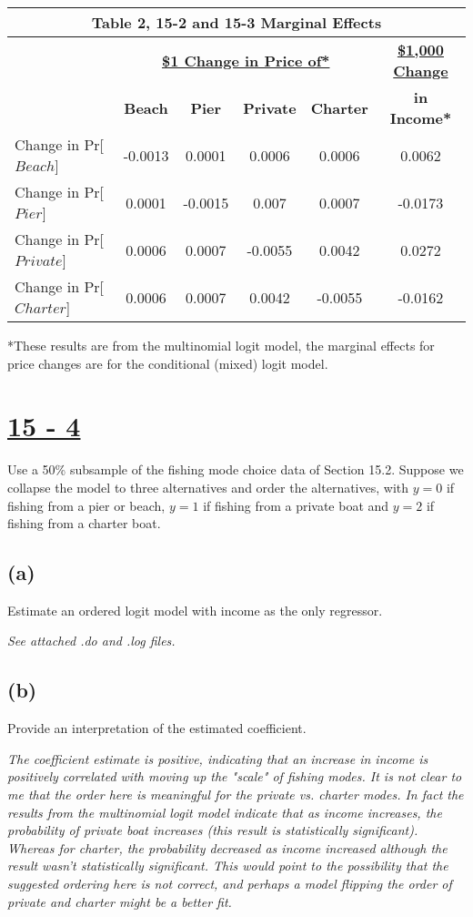 \documentclass[11pt]{article}
\theoremstyle{definition}
\begin{document}
\vspace{10.5mm}
\noindent
\begin{center}
\begin{tabular}{l c c c c c}
\hline\hline
\multicolumn{6}{c}{\textbf{Table 2, 15-2 and 15-3 Marginal Effects}} \\
\hline\hline 
& \multicolumn{4}{c}{\underline{\textbf{\$1 Change in Price of*}}} & \underline{\textbf{\$1,000 Change}} \\
& \textbf{Beach} & \textbf{Pier} & \textbf{Private} &\textbf{Charter} & \textbf{in Income*} \\
\hline
Change in Pr[$Beach$] & -0.0013 & 0.0001 & 0.0006 & 0.0006 & 0.0062 \\ 
Change in Pr[$Pier$] &  0.0001 & -0.0015 & 0.007 & 0.0007 &  -0.0173 \\
Change in Pr[$Private$] &  0.0006 & 0.0007 & -0.0055 & 0.0042 & 0.0272 \\ 
Change in Pr[$Charter$] & 0.0006 & 0.0007 & 0.0042 & -0.0055 & -0.0162 \\
\hline\hline
\end{tabular} 
\end{center} 
*These results are from the multinomial logit model, the marginal effects for price changes are for the conditional (mixed) logit model. 


\section*{\underline{15 - 4}} 
Use a 50\% subsample of the fishing mode choice data of Section 15.2.  Suppose we collapse the model to three alternatives and order the alternatives, with $y = 0$ if fishing from a pier or beach, $y = 1$ if fishing from a private boat and $y = 2$ if fishing from a charter boat.

\subsection*{(a)}
Estimate an ordered logit model with income as the only regressor. 

\textit{See attached .do and .log files.}

\subsection*{(b)}
Provide an interpretation of the estimated coefficient.

\textit{The coefficient estimate is positive, indicating that an increase in income is positively correlated with moving up the "scale" of fishing modes.  It is not clear to me that the order here is meaningful for the private vs. charter modes.  In fact the results from the multinomial logit model indicate that as income increases, the probability of private boat increases (this result is statistically significant).  Whereas for charter, the probability decreased as income increased although the result wasn't statistically significant.  This would point to the possibility that the suggested ordering here is not correct, and perhaps a model flipping the order of private and charter might be a better fit.}
\end{document}
